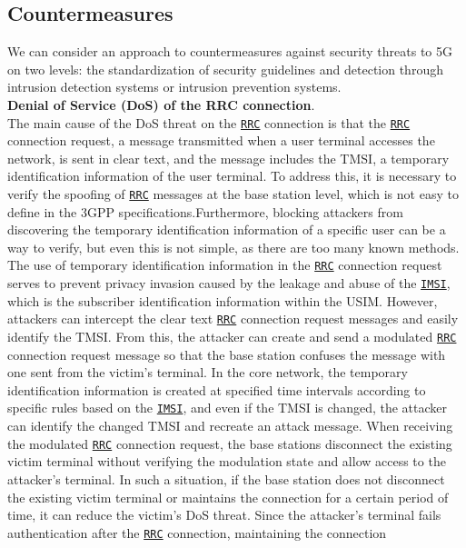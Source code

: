 \documentclass[english]{article}
\begin{document}
\subsection{Countermeasures}
We can consider an approach to countermeasures against security threats to 5G
on two levels: the standardization of security guidelines and detection through
intrusion detection systems or intrusion prevention systems. \\[0.2cm]
\textbf{Denial of Service (DoS) of the RRC connection}.\@\\
The main cause of the DoS threat on the \texttt{\hyperlink{RRC}{RRC}} connection is that the \texttt{\hyperlink{RRC}{RRC}} connection request,
a message transmitted when a user terminal accesses the network, is sent in clear text,
and the message includes the TMSI, a temporary identification information of the user terminal.
To address this, it is necessary to verify the spoofing of \texttt{\hyperlink{RRC}{RRC}} messages at the base station level,
which is not easy to define in the 3GPP specifications.\@ Furthermore, blocking attackers from
discovering the temporary identification information of a specific user can be a way to verify,
but even this is not simple, as there are too many known methods. The use of temporary identification
information in the \texttt{\hyperlink{RRC}{RRC}} connection request serves to prevent privacy invasion caused by the leakage
and abuse of the \texttt{\hyperlink{IMSI}{IMSI}}, which is the subscriber identification information within the USIM.
However, attackers can intercept the clear text \texttt{\hyperlink{RRC}{RRC}} connection request messages and easily
identify the TMSI. From this, the attacker can create and send a modulated \texttt{\hyperlink{RRC}{RRC}} connection
request message so that the base station confuses the message with one sent from the victim's
terminal. In the core network, the temporary identification information is created at specified
time intervals according to specific rules based on the \texttt{\hyperlink{IMSI}{IMSI}}, and even if the TMSI is changed,
the attacker can identify the changed TMSI and recreate an attack message. When receiving the
modulated \texttt{\hyperlink{RRC}{RRC}} connection request, the base stations disconnect the existing victim terminal
without verifying the modulation state and allow access to the attacker's terminal. In such
a situation, if the base station does not disconnect the existing victim terminal or maintains
the connection for a certain period of time, it can reduce the victim's DoS threat. Since the
attacker's terminal fails authentication after the \texttt{\hyperlink{RRC}{RRC}} connection, maintaining the connection
\end{document}
